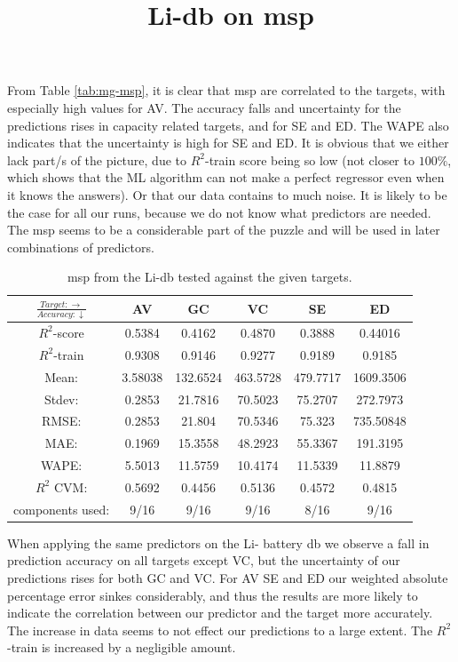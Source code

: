 From Table \ref{tab:mg-msp}, it is clear that msp are correlated to the targets, with especially high values for AV. The accuracy falls and uncertainty for the predictions rises in capacity related targets, and for SE and ED. The WAPE also indicates that the uncertainty is high for SE and ED. It is obvious that we either lack part/s of the picture, due to $R^2$-train score being so low (not closer to $100\%$, which shows that the ML algorithm can not make a perfect regressor even when it knows the answers). Or that our data contains to much noise. It is likely to be the case for all our runs, because we do not know what predictors are needed. The msp seems to be a considerable part of the puzzle and will be used in later combinations of predictors.

\begin{table}[H]
\scriptsize
\title{Li-db on msp}
\centering
\caption{msp from the Li-db tested against the given targets.}
\begin{tabular}{|c|c|c|c|c|c|}
	\hline 
	$\frac{Target: \rightarrow}{Accuracy:\downarrow} $ & AV & GC & VC & SE & ED  \\ 
	\hline
	$R^2$-score 	& 0.5384 & 0.4162 & 0.4870 & 0.3888 &  0.44016\\ 
	\hline 
	$R^2$-train 	&  0.9308 & 0.9146 & 0.9277 & 0.9189 & 0.9185 \\ 
	\hline
	Mean: 	 &3.58038&132.6524&463.5728&479.7717&1609.3506\\
	\hline 
	Stdev:	 &0.2853	&21.7816	&70.5023	&75.2707&272.7973	\\
	\hline
	RMSE: 	& 0.2853 & 21.804& 70.5346 & 75.323 & 735.50848 \\ 
	\hline 
	MAE: 	&0.1969& 15.3558 &  48.2923 & 55.3367 & 191.3195 \\ 
	\hline
	WAPE: 	& 5.5013 & 11.5759 & 10.4174  & 11.5339 & 11.8879 \\
	\hline
	$R^2$ CVM: &  0.5692 & 0.4456 & 0.5136  & 0.4572 &0.4815 \\
	\hline
	components used: & 9/16 & 9/16 & 9/16  & 8/16 &9/16 \\
	\hline
\end{tabular}
\label{tab:Li-msp}
\end{table}

When applying the same predictors on the Li- battery db we observe a fall in prediction accuracy on all targets except VC, but the uncertainty of our predictions rises for both GC and VC. For AV SE and ED our weighted absolute percentage error sinkes considerably, and thus the results are more likely to indicate the correlation between our predictor and the target more accurately.  
The increase in data seems to not effect our predictions to a large extent. The $R^2$-train is increased by a negligible amount. 

